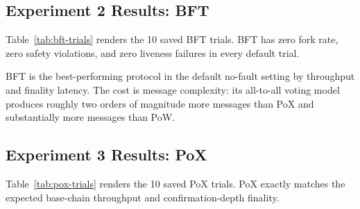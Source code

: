 \documentclass[11pt]{article}
\begin{document}
\subsection{Experiment 2 Results: BFT}

Table~\ref{tab:bft-trials} renders the 10 saved BFT trials. BFT has zero fork rate, zero safety violations, and zero liveness failures in every default trial.

\begin{table}[t]
\centering
\caption{BFT trial-level results read from the saved Phase 12 CSV.}
\label{tab:bft-trials}
\end{table}

BFT is the best-performing protocol in the default no-fault setting by throughput and finality latency. The cost is message complexity: its all-to-all voting model produces roughly two orders of magnitude more messages than PoX and substantially more messages than PoW.

\subsection{Experiment 3 Results: PoX}

Table~\ref{tab:pox-trials} renders the 10 saved PoX trials. PoX exactly matches the expected base-chain throughput and confirmation-depth finality.
\end{document}
